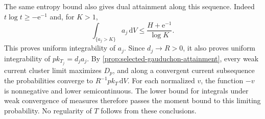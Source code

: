 The same entropy bound also gives dual attainment along this sequence. Indeed $t\log t\geq-\mathrm{e}^{-1}$ and, for $K>1$,
\[
 \int_{\{a_j>K\}}a_j\,\mathrm{d}V
       \leq\frac{H+\mathrm{e}^{-1}}{\log K}.
\]
This proves uniform integrability of $a_j$. Since $d_j\to R>0$, it also proves uniform integrability of $p k_{T_j}=d_ja_j$. By \cref{prop:selected-gauduchon-attainment}, every weak current cluster limit maximizes $D_p$, and along a convergent current subsequence the probabilities converge to $R^{-1}p k_T\,\mathrm{d}V$. For each normalized $v$, the function $-v$ is nonnegative and lower semicontinuous. The lower bound for integrals under weak convergence of measures therefore passes the moment bound to this limiting probability. No regularity of $T$ follows from these conclusions.
